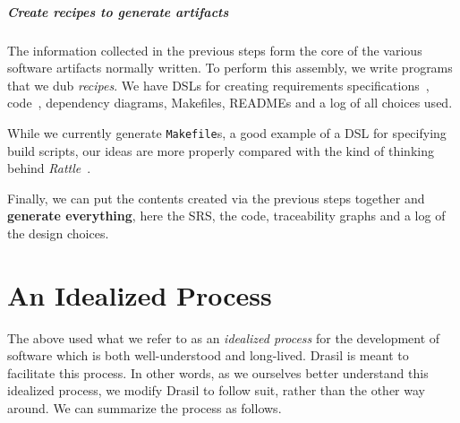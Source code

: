 \documentclass[a4paper,UKenglish,cleveref,autoref,thm-restate]{oasics-v2021}
\begin{document}
\subparagraph*{Create recipes to generate artifacts}
The information collected in the previous steps form the core of the various
software artifacts normally written. To perform this assembly, we write
programs that we dub \emph{recipes}. We have DSLs for creating 
requirements specifications~\cite{SmithEtAl2007},
code~\cite{GOOLPEPM}, dependency diagrams, Makefiles, READMEs and a log of all choices
used.

While we currently generate \texttt{Makefile}s, a good example of a DSL for
specifying build scripts, our ideas are more properly compared with
the kind of thinking behind \textit{Rattle}~\cite{mitchell:rattle_18_nov_2020}.

Finally, we can put the contents created via the previous steps together and
\textbf{generate everything}, here the SRS, the code, traceability graphs and
a log of the design choices.

\section{An Idealized Process}
\label{sec:idealized-process}

The above used what we refer to as an \emph{idealized process} for
the development of software which is both well-understood and
long-lived. Drasil is meant to facilitate this process. In other words,
as we ourselves better understand this idealized process, we modify Drasil
to follow suit, rather than the other way around. We can summarize the
process as follows.
\end{document}
